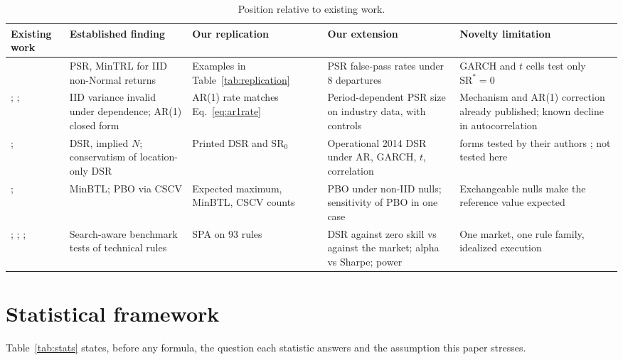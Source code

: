 \documentclass[11pt,a4paper]{article}
\newcommand{\SR}{\mathrm{SR}}
\begin{document}
\begin{table}[htbp]
\centering\small
\caption{Position relative to existing work.}\label{tab:lit}
\begin{tabularx}{\textwidth}{@{}>{\raggedright\arraybackslash}p{2.6cm}>{\raggedright\arraybackslash}X>{\raggedright\arraybackslash}X>{\raggedright\arraybackslash}X>{\raggedright\arraybackslash}X@{}}
\toprule
Existing work & Established finding & Our replication & Our extension & Novelty limitation \\
\midrule
\citet{bailey2012frontier} & PSR, MinTRL for IID non-Normal returns & Examples in Table~\ref{tab:replication} & PSR false-pass rates under 8 departures & GARCH and $t$ cells test only $\SR^\ast=0$ \\
\citet{lo2002}; \citet{ledoit2008}; \citet{lopezdeprado2026lipton} & IID variance invalid under dependence; AR(1) closed form & AR(1) rate matches Eq.~\eqref{eq:ar1rate} & Period-dependent PSR size on industry data, with controls & Mechanism and AR(1) correction already published; known decline in autocorrelation \citep{chordia2008} \\
\citet{bailey2014dsr}; \citet{lopezdeprado2026porcu} & DSR, implied $N$; conservatism of location-only DSR & Printed DSR and $\SR_0$ & Operational 2014 DSR under AR, GARCH, $t$, correlation & 2026 forms tested by their authors \citep[p.~23]{lopezdeprado2026lipton}; not tested here \\
\citet{bailey2014pseudo}; \citet{bailey2017pbo} & MinBTL; PBO via CSCV & Expected maximum, MinBTL, CSCV counts & PBO under non-IID nulls; sensitivity of PBO in one case & Exchangeable nulls make the reference value expected \\
\citet{white2000}; \citet{hansen2005}; \citet{sullivan1999}; \citet{bajgrowicz2012} & Search-aware benchmark tests of technical rules & SPA on 93 rules & DSR against zero skill vs against the market; alpha vs Sharpe; power & One market, one rule family, idealized execution \\
\bottomrule
\end{tabularx}
\end{table}

\section{Statistical framework}\label{sec:framework}

Table~\ref{tab:stats} states, before any formula, the question each statistic answers and the assumption this paper stresses.
\end{document}
